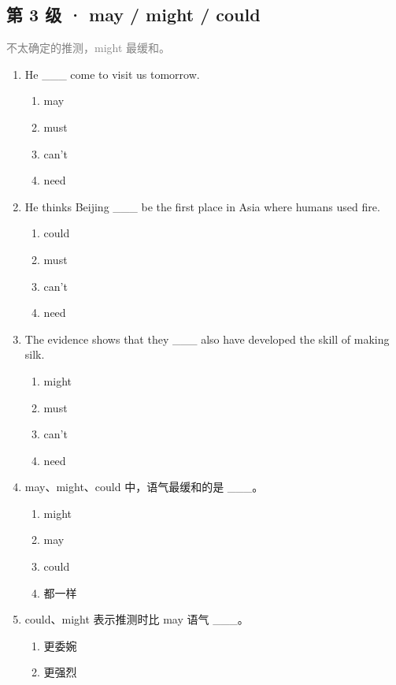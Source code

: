 \documentclass[11pt,a4paper]{ctexart}
\begin{document}
\subsection*{第 3 级 · may / might / could}
\noindent\textcolor{gray}{不太确定的推测，might 最缓和。}\par\smallskip
\begin{enumerate}[leftmargin=*,itemsep=4pt]
\item He \_\_\_ come to visit us tomorrow.
\begin{enumerate}[label=\Alph*.,leftmargin=2em,itemsep=1pt,topsep=2pt]
\item may
\item must
\item can’t
\item need
\end{enumerate}
\item He thinks Beijing \_\_\_ be the first place in Asia where humans used fire.
\begin{enumerate}[label=\Alph*.,leftmargin=2em,itemsep=1pt,topsep=2pt]
\item could
\item must
\item can’t
\item need
\end{enumerate}
\item The evidence shows that they \_\_\_ also have developed the skill of making silk.
\begin{enumerate}[label=\Alph*.,leftmargin=2em,itemsep=1pt,topsep=2pt]
\item might
\item must
\item can’t
\item need
\end{enumerate}
\item may、might、could 中，语气最缓和的是 \_\_\_。
\begin{enumerate}[label=\Alph*.,leftmargin=2em,itemsep=1pt,topsep=2pt]
\item might
\item may
\item could
\item 都一样
\end{enumerate}
\item could、might 表示推测时比 may 语气 \_\_\_。
\begin{enumerate}[label=\Alph*.,leftmargin=2em,itemsep=1pt,topsep=2pt]
\item 更委婉
\item 更强烈

\end{enumerate}
\end{enumerate}
\end{document}
